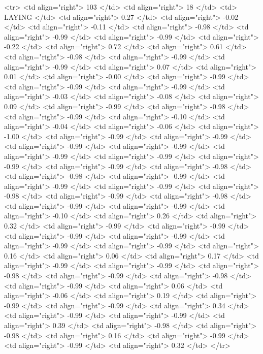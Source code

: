   <tr> <td align="right"> 103 </td> <td align="right">  18 </td> <td> LAYING </td> <td align="right"> 0.27 </td> <td align="right"> -0.02 </td> <td align="right"> -0.11 </td> <td align="right"> -0.98 </td> <td align="right"> -0.99 </td> <td align="right"> -0.99 </td> <td align="right"> -0.22 </td> <td align="right"> 0.72 </td> <td align="right"> 0.61 </td> <td align="right"> -0.98 </td> <td align="right"> -0.99 </td> <td align="right"> -0.99 </td> <td align="right"> 0.07 </td> <td align="right"> 0.01 </td> <td align="right"> -0.00 </td> <td align="right"> -0.99 </td> <td align="right"> -0.99 </td> <td align="right"> -0.99 </td> <td align="right"> -0.03 </td> <td align="right"> -0.08 </td> <td align="right"> 0.09 </td> <td align="right"> -0.99 </td> <td align="right"> -0.98 </td> <td align="right"> -0.99 </td> <td align="right"> -0.10 </td> <td align="right"> -0.04 </td> <td align="right"> -0.06 </td> <td align="right"> -1.00 </td> <td align="right"> -0.99 </td> <td align="right"> -0.99 </td> <td align="right"> -0.99 </td> <td align="right"> -0.99 </td> <td align="right"> -0.99 </td> <td align="right"> -0.99 </td> <td align="right"> -0.99 </td> <td align="right"> -0.99 </td> <td align="right"> -0.98 </td> <td align="right"> -0.98 </td> <td align="right"> -0.99 </td> <td align="right"> -0.99 </td> <td align="right"> -0.99 </td> <td align="right"> -0.98 </td> <td align="right"> -0.99 </td> <td align="right"> -0.98 </td> <td align="right"> -0.99 </td> <td align="right"> -0.99 </td> <td align="right"> -0.10 </td> <td align="right"> 0.26 </td> <td align="right"> 0.32 </td> <td align="right"> -0.99 </td> <td align="right"> -0.99 </td> <td align="right"> -0.99 </td> <td align="right"> -0.99 </td> <td align="right"> -0.99 </td> <td align="right"> -0.99 </td> <td align="right"> 0.16 </td> <td align="right"> 0.06 </td> <td align="right"> 0.17 </td> <td align="right"> -0.99 </td> <td align="right"> -0.99 </td> <td align="right"> -0.98 </td> <td align="right"> -0.99 </td> <td align="right"> -0.98 </td> <td align="right"> -0.99 </td> <td align="right"> 0.06 </td> <td align="right"> -0.06 </td> <td align="right"> 0.19 </td> <td align="right"> -0.99 </td> <td align="right"> -0.99 </td> <td align="right"> 0.34 </td> <td align="right"> -0.99 </td> <td align="right"> -0.99 </td> <td align="right"> 0.39 </td> <td align="right"> -0.98 </td> <td align="right"> -0.98 </td> <td align="right"> 0.16 </td> <td align="right"> -0.99 </td> <td align="right"> -0.99 </td> <td align="right"> 0.32 </td> </tr>

